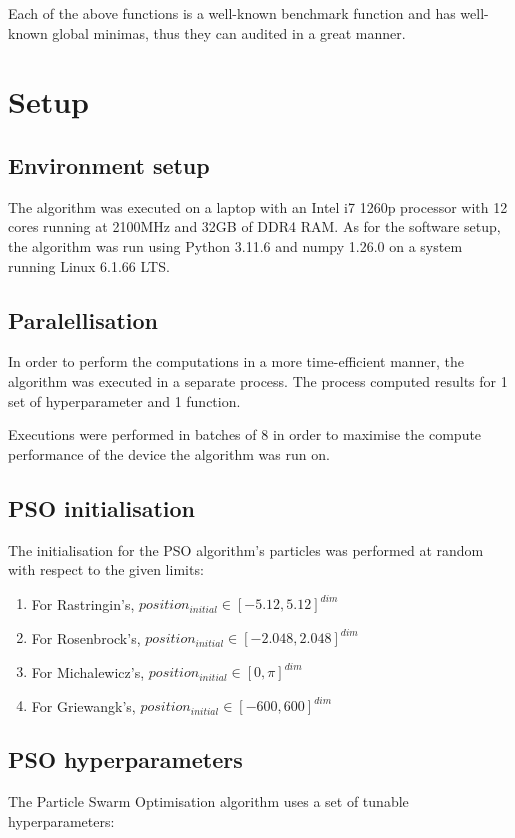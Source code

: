 \documentclass[conference]{IEEEtran}
\begin{document}
Each of the above functions is a well-known benchmark function and has well-known global minimas, thus they can audited
in a great manner.

\section{Setup}

\subsection{Environment setup}
The algorithm was executed on a laptop with an Intel i7 1260p processor with 12 cores running at 2100MHz and 32GB of DDR4 RAM.
As for the software setup, the algorithm was run using Python 3.11.6 and numpy 1.26.0 on a system running Linux 6.1.66 LTS.

\subsection{Paralellisation}
In order to perform the computations in a more time-efficient manner, the algorithm was executed in a separate process.
The process computed results for 1 set of hyperparameter and 1 function.

Executions were performed in batches of 8 in order to maximise the compute performance of the device the algorithm was run on.

\subsection{PSO initialisation}
The initialisation for the PSO algorithm's particles was performed at random with respect to the given limits:

\begin{enumerate}
    \item For Rastringin's, $position_{initial} \in [-5.12, 5.12]^{dim}$
    \item For Rosenbrock's, $position_{initial} \in [-2.048, 2.048]^{dim}$
    \item For Michalewicz's, $position_{initial} \in [0, \pi]^{dim}$
    \item For Griewangk's, $position_{initial} \in [-600, 600]^{dim}$
\end{enumerate}

\subsection{PSO hyperparameters}
The Particle Swarm Optimisation algorithm uses a set of tunable hyperparameters:
\end{document}
